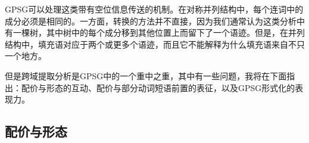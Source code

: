 \zl
GPSG可以处理这类带有空位信息传送的机制。在对称并列结构中，每个连词中的\slaschc 成分必须是相同的。一方面，转换的方法并不直接，因为我们通常认为这类分析中有一棵树，其中树中的每个成分移到其他位置上而留下了一个语迹。但是，在并列结构中，填充语对应于两个或更多个语迹，而且它不能解释为什么填充语来自不只一个地方。

但是跨域提取分析是GPSG中的一个重中之重，其中有一些问题，我将在下面指出：配价与形态的互动、配价与部分动词短语前置的表征，以及GPSG形式化的表现力。

\subsection{配价与形态}

